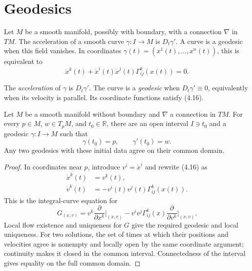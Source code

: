\section{Geodesics}

Let $M$ be a smooth manifold, possibly with boundary, with a connection $\nabla$
in $TM$. The acceleration of a smooth curve $\gamma\colon I\to M$ is
$D_t\gamma'$. A curve is a geodesic when this field vanishes. In coordinates
$\gamma(t)=(x^1(t),\ldots,x^n(t))$, this is equivalent to
\begin{equation}
\ddot x^k(t)+\dot x^i(t)\dot x^j(t)\Gamma^k_{ij}(x(t))=0. \tag{4.16}
\end{equation}

\begin{definition}[Geodesic]
\label{def:geodesic}





The \emph{acceleration} of $\gamma$ is $D_t\gamma'$. The curve is a
\emph{geodesic} when $D_t\gamma'\equiv0$, equivalently when its velocity is
parallel. Its coordinate functions satisfy (4.16).
\end{definition}

\begin{theorem}
\label{thm:geodesic-existence-uniqueness}


Let $M$ be a smooth manifold without boundary and $\nabla$ a connection in
$TM$. For every $p\in M$, $w\in T_pM$, and $t_0\in\mathbb R$, there are an open
interval $I\ni t_0$ and a geodesic $\gamma\colon I\to M$ such that
\[
\gamma(t_0)=p,
\qquad \gamma'(t_0)=w.
\]
Any two geodesics with these initial data agree on their common domain.
\end{theorem}

\begin{proof}
\sketch In coordinates near $p$, introduce $v^i=\dot x^i$ and rewrite (4.16) as
\begin{align}
\dot x^k(t)&=v^k(t),\\
\dot v^k(t)&=-v^i(t)v^j(t)\Gamma^k_{ij}(x(t)). \tag{4.17}
\end{align}
This is the integral-curve equation for
\begin{equation}
G_{(x,v)}=v^k\frac{\partial}{\partial x^k}\bigg|_{(x,v)}
-v^iv^j\Gamma^k_{ij}(x)\frac{\partial}{\partial v^k}\bigg|_{(x,v)}. \tag{4.18}
\end{equation}
Local flow existence and uniqueness for $G$ give the required geodesic and local
uniqueness. For two solutions, the set of times at which their positions and
velocities agree is nonempty and locally open by the same coordinate argument;
continuity makes it closed in the common interval. Connectedness of the interval
gives equality on the full common domain.
\end{proof}

